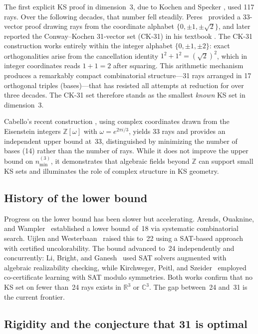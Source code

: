 \documentclass[twocolumn,pra,superscriptaddress,nofootinbib]{revtex4-2}
\newcommand{\R}{\mathbb{R}}
\newcommand{\C}{\mathbb{C}}
\newcommand{\Z}{\mathbb{Z}}
\begin{document}
The first explicit KS proof in dimension~3, due to Kochen and Specker
\cite{KochenSpecker1967}, used 117 rays. Over the following decades, that number
fell steadily. Peres~\cite{Peres1991} provided a 33-vector proof drawing rays
from the coordinate alphabet $\{0, \pm 1, \pm\sqrt{2}\}$, and later reported the
Conway--Kochen 31-vector set (CK-31) in his textbook \cite{Peres1993,ConwayKochen}.
The CK-31 construction works entirely within the integer alphabet
$\{0,\pm 1, \pm 2\}$: exact orthogonalities arise from the
cancellation identity $1^2 + 1^2 = (\sqrt{2})^2$, which in integer coordinates
reads $1 + 1 = 2$ after squaring. This arithmetic mechanism produces a remarkably
compact combinatorial structure---31 rays arranged in 17 orthogonal
triples (bases)---that has resisted all attempts at reduction for over three decades.
The CK-31 set therefore stands as the smallest \emph{known} KS set in dimension~3.

Cabello's recent construction \cite{Cabello2025simplest}, using complex coordinates
drawn from the Eisenstein integers $\Z[\omega]$ with $\omega = e^{2\pi i/3}$,
yields 33 rays and provides an independent upper bound at~33, distinguished by
minimizing the number of bases (14) rather than the number of rays. While it does
not improve the upper bound on $n_{\min}^{(3)}$, it demonstrates that algebraic
fields beyond $\Z$ can support small KS sets and illuminates the role of complex
structure in KS geometry.

\subsection*{History of the lower bound}

Progress on the lower bound has been slower but accelerating. Arends, Ouaknine,
and Wampler~\cite{ArendsOuaknineWampler2011} established a lower bound of~18 via
systematic combinatorial search. Uijlen and Westerbaan~\cite{UijlenWesterbaan2016}
raised this to~22 using a SAT-based approach with certified uncolorability.
The bound advanced to~24 independently and concurrently: Li, Bright, and
Ganesh~\cite{LiBrightGanesh2024} used SAT solvers augmented with algebraic
realizability checking, while Kirchweger, Peitl, and
Szeider~\cite{KirchwegarPeitlSzeider2023} employed co-certificate learning with
SAT modulo symmetries. Both works confirm that no KS set on fewer than~24 rays
exists in $\R^3$ or $\C^3$. The gap between~24 and~31 is the current frontier.

\subsection*{Rigidity and the conjecture that 31 is optimal}
\end{document}
